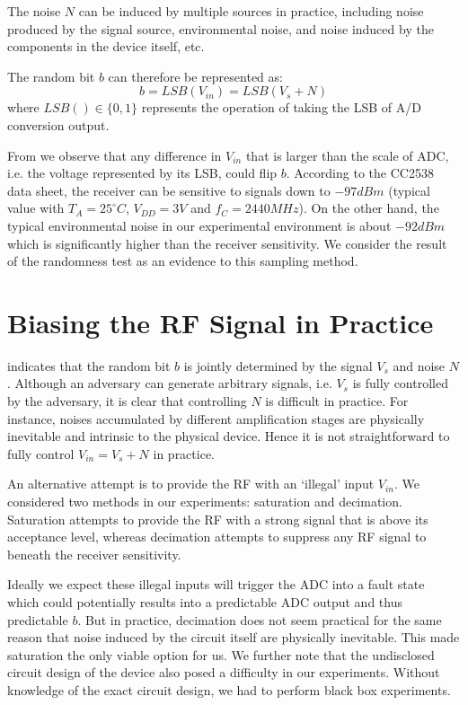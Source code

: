 The noise $N$ can be induced by multiple sources in practice, including noise produced by the signal source, environmental noise, and noise induced by the components in the device itself, etc.

The random bit $b$ can therefore be represented as:
\begin{equation} \label{RNDOutput}
b = LSB(V_{in}) = LSB(V_s + N)
\end{equation}
where $LSB() \in \{0,1\}$ represents the operation of taking the LSB of A/D conversion output.

From  we observe that any difference in $V_{in}$ that is larger than the scale of ADC, i.e. the voltage represented by its LSB, could flip $b$. According to the CC2538 data sheet\cite{CC2538Datasheet}, the receiver can be sensitive to signals down to $-97dBm$ (typical value with $T_A = 25^{\circ}C$, $V_{DD} = 3V$ and $f_{C} = 2440MHz$). On the other hand, the typical environmental noise in our experimental environment is about $-92dBm$ which is significantly higher than the receiver sensitivity. We consider the result of the randomness test as an evidence to this sampling method.

\section{Biasing the RF Signal in Practice}\label{Jamming}
  indicates that the random bit $b$ is jointly determined by the signal $V_s$ and noise $N$. Although an adversary can generate arbitrary signals, i.e. $V_s$ is fully  controlled by the adversary, it is clear that controlling $N$ is difficult in practice. For instance, noises accumulated by different amplification stages are physically inevitable and intrinsic to the physical device. Hence it is not straightforward to fully control $V_{in}= V_s +N$ in practice.

An alternative attempt is to provide the RF with an `illegal' input $V_{in}$. We considered two methods in our experiments: saturation and decimation. Saturation attempts to provide the RF with a strong signal that is above its acceptance level, whereas decimation attempts to suppress any RF signal to beneath the receiver sensitivity.

Ideally we expect these illegal inputs will trigger the ADC into a fault state which could potentially results into a predictable ADC output and thus predictable $b$. But in practice, decimation does not seem practical for the same reason that noise induced by the circuit itself are physically inevitable. This made saturation the only viable option for us. We further note that the undisclosed circuit design of the device also posed a difficulty in our experiments. Without knowledge of the exact circuit design, we had to perform black box experiments. 

